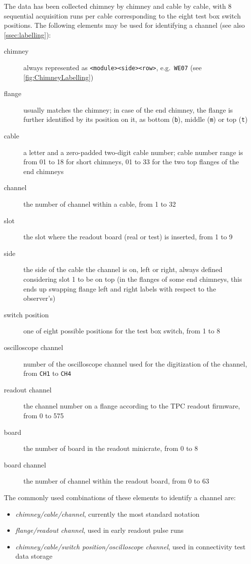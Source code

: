 The data has been collected chimney by chimney and cable by cable, with 8 sequential acquisition runs per cable corresponding to the eight test box switch positions.
The following elements may be used for identifying a channel (see also \cref{ssec:labelling}):
\begin{description}
  \item[chimney] always represented as \texttt{<module><side><row>}, e.g.\ \texttt{WE07} (see \cref{fig:ChimneyLabelling})
  \item[flange] usually matches the chimney; in case of the end chimney, the flange is further identified by its position on it, as bottom (\texttt{b}), middle (\texttt{m}) or top (\texttt{t})
  \item[cable] a letter and a zero-padded two-digit cable number; cable number range is from 01 to 18 for short chimneys, 01 to 33 for the two top flanges of the end chimneys
  \item[channel] the number of channel within a cable, from 1 to 32
  \item[slot] the slot where the readout board (real or test) is inserted, from 1 to 9
  \item[side] the side of the cable the channel is on, left or right, always defined considering slot 1 to be on top (in the flanges of some end chimneys, this ends up swapping flange left and right labels with respect to the observer's)
  \item[switch position] one of eight possible positions for the test box switch, from 1 to 8
  \item[oscilloscope channel] number of the oscilloscope channel used for the digitization of the channel, from \texttt{CH1} to \texttt{CH4}
  \item[readout channel] the channel number on a flange according to the TPC readout firmware, from 0 to 575
  \item[board] the number of board in the readout minicrate, from 0 to 8
  \item[board channel] the number of channel within the readout board\cite{FEreadoutBoard}, from 0 to 63
\end{description}

The commonly used combinations of these elements to identify a channel are:
\begin{itemize}
  \item \emph{chimney/cable/channel}, currently the most standard notation
  \item \emph{flange/readout channel}, used in early readout pulse runs
  \item \emph{chimney/cable/switch position/oscilloscope channel}, used in connectivity test data storage
\end{itemize}

